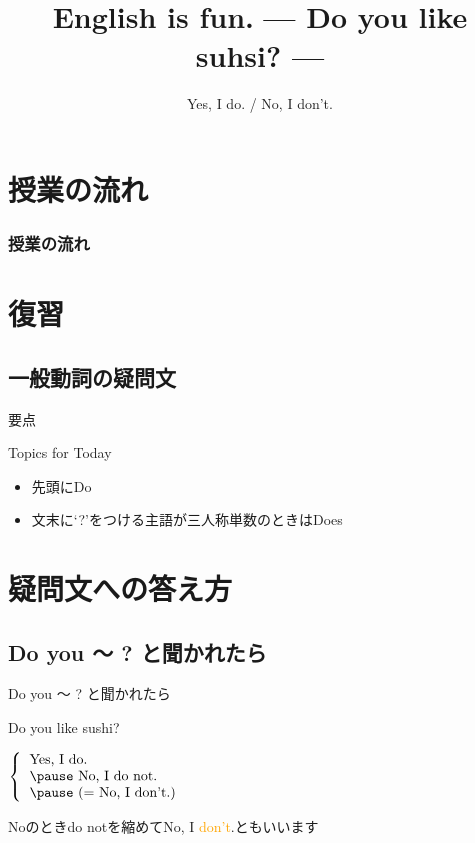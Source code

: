 \documentclass[aspectratio=169]{beamer}
\title{English is fun.\,\,{}--- Do you like suhsi? ---}
\subtitle{Yes, I do. / No, I don't.}
\author{}
\institute[]{}
\date[]
\newcommand{\myaudio}[1]{\href{#1}{\faVolumeUp}}
\begin{document}
\begin{frame}[plain]
  \titlepage
\end{frame}

\section*{授業の流れ}
\begin{frame}[plain]
  \frametitle{授業の流れ}
  \tableofcontents
\end{frame}


\section{復習}
\subsection{一般動詞の疑問文}
\begin{frame}[plain]{要点}

\pause
\begin{exampleblock}{Topics for Today}
\begin{itemize}
 \item   先頭にDo\pause
 \item   文末に`?'をつける主語が三人称単数のときはDoes
\end{itemize}
     \end{exampleblock}


\end{frame}


\section{疑問文への答え方}
\subsection{Do you 〜 ? と聞かれたら}
 \begin{frame}[plain]{Do you 〜 ? と聞かれたら}
 \Large
\pause

Do you like sushi?\hfill{}

\vspace{20pt}
\pause

\mbox{}\hspace{100pt}$\left\{\begin{tabular}{l}
         \text{Yes, I do.}\\\pause
         \text{No, I do not.}\\\pause
         \text{(}= \text{No, I don't.)}
        \end{tabular}\right.$

\pause

\mbox{}\hfill{}{\small Noのときdo notを縮めてNo, I \textcolor{orange}{don't}.ともいいます}

\pause
\mbox{}\hfill\myaudio{./audio/011_answer_do_01.mp3}
\end{frame}
\end{document}
